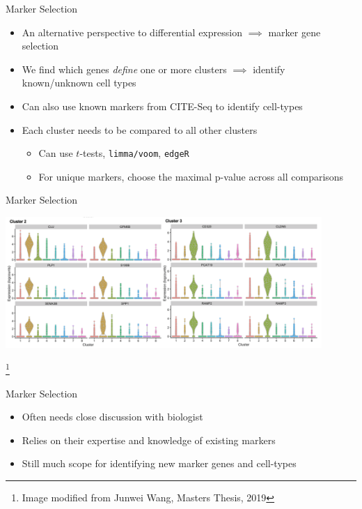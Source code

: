 \documentclass[aspectratio=169,11pt]{beamer}
\newcommand\blfootnote[1]{%
  \begingroup
  \renewcommand\thefootnote{}\footnote{#1}%
  \addtocounter{footnote}{-1}%
  \endgroup
}
\begin{document}
\begin{frame}{Marker Selection}

	\begin{itemize}
		\item An alternative perspective to differential expression $\implies$ marker gene selection
		\item We find which genes \textit{define} one or more clusters $\implies$ identify known/unknown cell types
		\item Can also use known markers from CITE-Seq to identify cell-types
		\item Each cluster needs to be compared to all other clusters
		\begin{itemize}
			\item Can use $t$-tests, \texttt{limma/voom}, \texttt{edgeR}
			\item For unique markers, choose the maximal p-value across all comparisons
		\end{itemize}
	\end{itemize}

\end{frame}

\begin{frame}{Marker Selection}

	\begin{center}
		\includegraphics[width=0.9\textwidth]{figures/junweiCluster3.png}
	\end{center}

	\blfootnote{Image modified from Junwei Wang, Masters Thesis, 2019}

\end{frame}

\begin{frame}{Marker Selection}

	\begin{itemize}
		\item Often needs close discussion with biologist
		\item Relies on their expertise and knowledge of existing markers
		\item Still much scope for identifying new marker genes and cell-types
	\end{itemize}

\end{frame}
\end{document}
